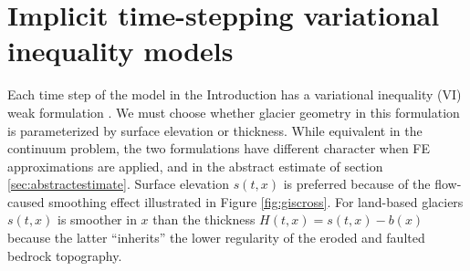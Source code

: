 \documentclass[hidelinks,onefignum,onetabnum,final]{siamart220329}  %
\begin{document}
\section{Implicit time-stepping variational inequality models} \label{sec:models}

Each time step of the model in the Introduction has a variational inequality (VI) weak formulation \cite{Evans2010,KinderlehrerStampacchia1980}.  We must choose whether glacier geometry in this formulation is parameterized by surface elevation or thickness.  While equivalent in the continuum problem, the two formulations have different character when FE approximations are applied, and in the abstract estimate of section \ref{sec:abstractestimate}.  Surface elevation $s(t,x)$ is preferred because of the flow-caused smoothing effect illustrated in Figure \ref{fig:giscross}.  For land-based glaciers $s(t,x)$ is smoother in $x$ than the thickness $H(t,x) = s(t,x)-b(x)$ because the latter ``inherits'' the lower regularity of the eroded and faulted bedrock topography.
\end{document}
